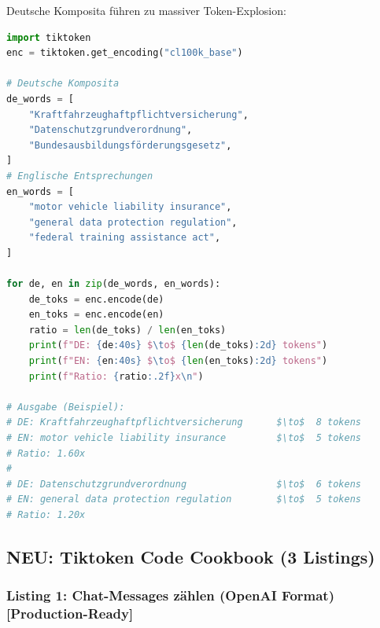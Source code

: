Deutsche Komposita führen zu massiver Token-Explosion:

\begin{lstlisting}[language=Python, label=lst:de_en_tokens, caption={Deutsch vs. Englisch Token-Zerlegung}]
import tiktoken
enc = tiktoken.get_encoding("cl100k_base")

# Deutsche Komposita
de_words = [
    "Kraftfahrzeughaftpflichtversicherung",
    "Datenschutzgrundverordnung",
    "Bundesausbildungsförderungsgesetz",
]
# Englische Entsprechungen
en_words = [
    "motor vehicle liability insurance",
    "general data protection regulation",
    "federal training assistance act",
]

for de, en in zip(de_words, en_words):
    de_toks = enc.encode(de)
    en_toks = enc.encode(en)
    ratio = len(de_toks) / len(en_toks)
    print(f"DE: {de:40s} $\to$ {len(de_toks):2d} tokens")
    print(f"EN: {en:40s} $\to$ {len(en_toks):2d} tokens")
    print(f"Ratio: {ratio:.2f}x\n")

# Ausgabe (Beispiel):
# DE: Kraftfahrzeughaftpflichtversicherung      $\to$  8 tokens
# EN: motor vehicle liability insurance         $\to$  5 tokens
# Ratio: 1.60x
#
# DE: Datenschutzgrundverordnung                $\to$  6 tokens
# EN: general data protection regulation        $\to$  5 tokens
# Ratio: 1.20x
\end{lstlisting}


\subsection{NEU: Tiktoken Code Cookbook (3 Listings)}
\label{sec:tiktoken_cookbook}

\subsubsection{Listing 1: Chat-Messages zählen (OpenAI Format) [Production-Ready]}
\label{lst:count_chat_tokens_token}

